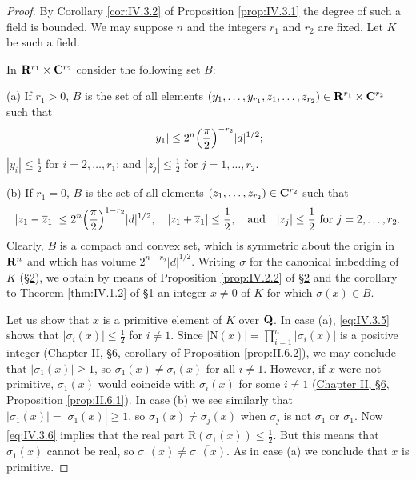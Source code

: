 \begin{proof}
By Corollary \ref{cor:IV.3.2} of Proposition \ref{prop:IV.3.1} the degree of
such a field is bounded. We may suppose $n$ and the integers $r_{1}$ and
$r_{2}$ are fixed. Let $K$ be such a field.

In $\mathbf{R}^{r_{1}}\times\mathbf{C}^{r_{2}}$ consider the following set $B$:

(a) If $r_{1}>0$, $B$ is the set of all elements
$(y_{1},\ldots,y_{r_{1}},z_{1},\ldots,z_{r_{2}})\in
\mathbf{R}^{r_{1}}\times\mathbf{C}^{r_{2}}$ such that
\begin{equation}
|y_{1}|\leq2^{n}\Bigl(\frac{\pi}{2}\Bigr)^{-r_{2}}|d|^{1/2};
\label{eq:IV.3.5}
\end{equation}
$|y_{i}|\leq\frac{1}{2}$ for $i=2,\ldots,r_{1}$; and
$|z_{j}|\leq\frac{1}{2}$ for $j=1,\ldots,r_{2}$.

(b) If $r_{1}=0$, $B$ is the set of all elements
$(z_{1},\ldots,z_{r_{2}})\in\mathbf{C}^{r_{2}}$ such that
\begin{equation}
|z_{1}-\overline{z}_{1}|\leq2^{n}\Bigl(\frac{\pi}{2}\Bigr)^{1-r_{2}}
|d|^{1/2},\quad |z_{1}+\overline{z}_{1}|\leq\frac{1}{2},\quad
\text{and}\quad |z_{j}|\leq\frac{1}{2}\ \text{for }j=2,\ldots,r_{2}.
\label{eq:IV.3.6}
\end{equation}
Clearly, $B$ is a compact and convex set, which is symmetric about the
origin in $\mathbf{R}^{n}$ and which has volume $2^{n-r_{2}}|d|^{1/2}$. Writing
$\sigma$ for the canonical imbedding of $K$ (\hyperref[sec:4.2]{§2}), we obtain by means of
Proposition \ref{prop:IV.2.2} of \hyperref[sec:4.2]{§2} and the corollary to Theorem
\ref{thm:IV.1.2} of \hyperref[sec:4.1]{§1} an integer $x\neq0$ of $K$ for which $\sigma(x)\in B$.

Let us show that $x$ is a primitive element of $K$ over $\mathbf{Q}$. In case (a),
\eqref{eq:IV.3.5} shows that $|\sigma_{i}(x)|\leq\frac{1}{2}$ for $i\neq1$.
Since $|\mathrm{N}(x)|=\prod_{i=1}^{n}|\sigma_{i}(x)|$ is a positive integer
(\hyperref[sec:2.6]{Chapter II, §6}, corollary of Proposition \ref{prop:II.6.2}), we may
conclude that $|\sigma_{1}(x)|\geq1$, so $\sigma_{1}(x)\neq\sigma_{i}(x)$
for all $i\neq1$. However, if $x$ were not primitive, $\sigma_{1}(x)$ would
coincide with $\sigma_{i}(x)$ for some $i\neq1$ (\hyperref[sec:2.6]{Chapter II, §6},
Proposition \ref{prop:II.6.1}). In case (b) we see similarly that
$|\sigma_{1}(x)|=|\overline{\sigma_{1}(x)}|\geq1$, so
$\sigma_{1}(x)\neq\sigma_{j}(x)$ when $\sigma_{j}$ is not $\sigma_{1}$ or
$\overline{\sigma_{1}}$. Now \eqref{eq:IV.3.6} implies that the real part
$\mathrm{R}(\sigma_{1}(x))\leq\frac{1}{2}$. But this means that $\sigma_{1}(x)$
cannot be real, so $\sigma_{1}(x)\neq\overline{\sigma_{1}(x)}$. As in case
(a) we conclude that $x$ is primitive.


\end{proof}
